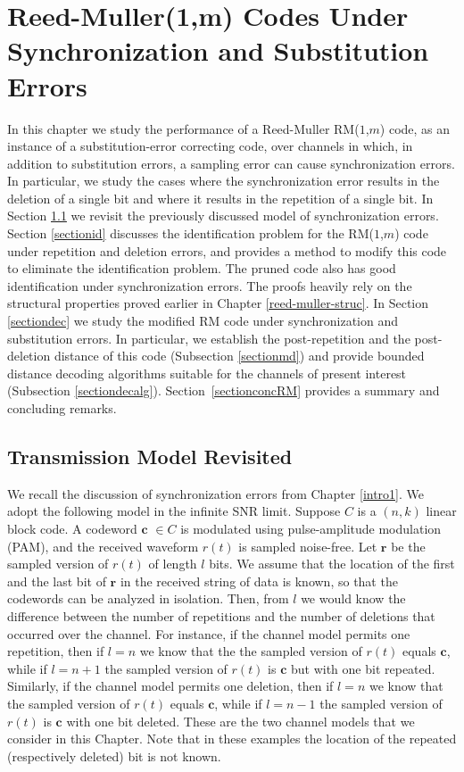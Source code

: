 \chapter[Reed-Muller (1,m) Codes Under Synchronization and Substitution Errors]
{Reed-Muller(1,m) Codes Under Synchronization and Substitution
Errors }\label{reed-muller-perfm}

In this chapter we study the performance of a Reed-Muller
RM($1$,$m$) code, as an instance of a substitution-error correcting
code, over channels in which, in addition to substitution errors, a
sampling error can cause synchronization errors. In particular, we
study the cases where the synchronization error results in the
deletion of a single bit and where it results in the repetition of a
single bit. In Section \ref{Model} we revisit the previously
discussed model of synchronization errors. Section \ref{sectionid}
discusses the identification problem for the RM($1$,$m$) code under
repetition and deletion errors, and provides a method to modify this
code to eliminate the identification problem. The pruned code also
has good identification under synchronization errors. The proofs
heavily rely on the structural properties proved earlier in Chapter
\ref{reed-muller-struc}. In Section \ref{sectiondec} we study the
modified RM code under synchronization and substitution errors. In
particular, we establish the post-repetition and the post-deletion
distance of this code (Subsection \ref{sectionmd}) and provide
bounded distance decoding algorithms suitable for the channels of
present interest (Subsection \ref{sectiondecalg}).
Section~\ref{sectionconcRM} provides a summary and concluding
remarks.

\section{Transmission Model Revisited}\label{Model}

We recall the discussion of synchronization errors from Chapter
\ref{intro1}. We adopt the following model in the infinite SNR
limit. Suppose $C$ is a $(n,k)$ linear block code. A codeword
$\mathbf{c}$ $\in C$ is modulated using pulse-amplitude modulation
(PAM), and the received waveform $r(t)$ is sampled noise-free. Let
$\mathbf{r}$ be the sampled version of $r(t)$ of length $l$ bits. We
assume that the location of the first and the last bit of
$\mathbf{r}$ in the received string of data is known, so that the
codewords can be analyzed in isolation. Then, from $l$ we would know
the difference between the number of repetitions and the number of
deletions that occurred over the channel. For instance, if the
channel model permits one repetition, then if $l=n$ we know that the
the sampled version of $r(t)$ equals $\mathbf{c}$, while if $l=n+1$
the sampled version of $r(t)$ is $\mathbf{c}$ but with one bit
repeated. Similarly, if the channel model permits one deletion, then
if $l=n$ we know that the sampled version of $r(t)$ equals
$\mathbf{c}$, while if $l=n-1$ the sampled version of $r(t)$ is
$\mathbf{c}$ with one bit deleted. These are the two channel models
that we consider in this Chapter. Note that in these examples the
location of the repeated (respectively deleted) bit is not known.

